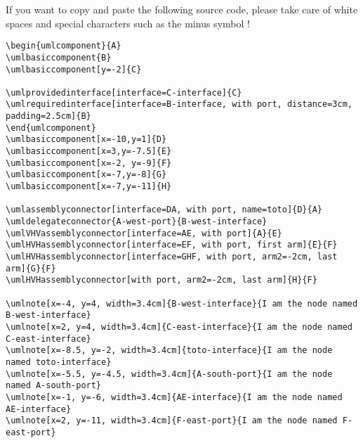 \documentclass[a4paper,11pt, svgnames]{article}
\date{}
\title{}
\author{}
\begin{document}
\maketitle

If you want to copy and paste the following source code, please take care of white spaces and special characters such as the minus symbol !

\medskip
\lstset{breaklines=true, frame=trBL, language=tikzuml}
\begin{lstlisting}
\begin{umlcomponent}{A}
\umlbasiccomponent{B}
\umlbasiccomponent[y=-2]{C}

\umlprovidedinterface[interface=C-interface]{C}
\umlrequiredinterface[interface=B-interface, with port, distance=3cm, padding=2.5cm]{B}
\end{umlcomponent}
\umlbasiccomponent[x=-10,y=1]{D}
\umlbasiccomponent[x=3,y=-7.5]{E}
\umlbasiccomponent[x=-2, y=-9]{F}
\umlbasiccomponent[x=-7,y=-8]{G}
\umlbasiccomponent[x=-7,y=-11]{H}

\umlassemblyconnector[interface=DA, with port, name=toto]{D}{A}
\umldelegateconnector{A-west-port}{B-west-interface}
\umlVHVassemblyconnector[interface=AE, with port]{A}{E}
\umlHVHassemblyconnector[interface=EF, with port, first arm]{E}{F}
\umlHVHassemblyconnector[interface=GHF, with port, arm2=-2cm, last arm]{G}{F}
\umlHVHassemblyconnector[with port, arm2=-2cm, last arm]{H}{F}

\umlnote[x=-4, y=4, width=3.4cm]{B-west-interface}{I am the node named B-west-interface}
\umlnote[x=2, y=4, width=3.4cm]{C-east-interface}{I am the node named C-east-interface}
\umlnote[x=-8.5, y=-2, width=3.4cm]{toto-interface}{I am the node named toto-interface}
\umlnote[x=-5.5, y=-4.5, width=3.4cm]{A-south-port}{I am the node named A-south-port}
\umlnote[x=-1, y=-6, width=3.4cm]{AE-interface}{I am the node named AE-interface}
\umlnote[x=2, y=-11, width=3.4cm]{F-east-port}{I am the node named F-east-port}
\end{lstlisting}
\end{document}
